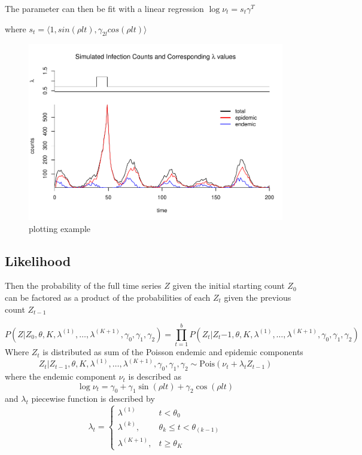 \documentclass[11pt,a4paper]{article}
\numberwithin{equation}{section}
\begin{document}
The parameter can then be fit with a linear regression
\(\log{\nu_t} = s_t\gamma^T\)

where
\(s_t = \langle 1, sin(\rho l t), \gamma_{2l}cos(\rho l t) \rangle\)

\begin{figure}
\centering
\includegraphics{thesis_draft_files/figure-latex/simulation figure-1.pdf}
\caption{\label{fig:figs}plotting example}
\end{figure}

\hypertarget{likelihood}{%
\subsection{Likelihood}\label{likelihood}}

Then the probability of the full time series \(Z\) given the initial
starting count \(Z_0\) can be factored as a product of the probabilities
of each \(Z_t\) given the previous count \(Z_{t-1}\)

\[P(Z|Z_0,\theta, K, \lambda^{(1)}, \dots, \lambda^{(K+1)}, \gamma_0, \gamma_1, \gamma_2 ) = \prod_{t=1}^b P(Z_t|Z_t{-1}, \theta, K, \lambda^{(1)}, \dots, \lambda^{(K+1)}, \gamma_0, \gamma_1, \gamma_2)\]
Where \(Z_t\) is distributed as sum of the Poisson endemic and epidemic
components
\[Z_t|Z_{t-1}, \theta, K, \lambda^{(1)}, \dots, \lambda^{(K+1)}, \gamma_0, \gamma_1, \gamma_2 \sim\text{Pois}(\nu_t + \lambda_tZ_{t-1})\]
where the endemic component \(\nu_t\) is described as
\[\log{\nu_t} = \gamma_0 +  \gamma_{1}\sin(\rho l t)+\gamma_{2}\cos(\rho l t)\]
and \(\lambda_t\) piecewise function is described by
\[ \lambda_t =  \begin{cases} \lambda^{(1)} & t < \theta_0 \\
\lambda^{(k)}, & \theta_{k} \leq t < \theta_{(k-1)} \\
\lambda^{(K+1)}, & t \geq \theta_K \end{cases}\]
\end{document}
